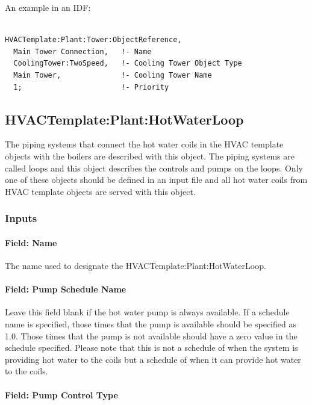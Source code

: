 An example in an IDF:

\begin{lstlisting}

HVACTemplate:Plant:Tower:ObjectReference,
  Main Tower Connection,   !- Name
  CoolingTower:TwoSpeed,   !- Cooling Tower Object Type
  Main Tower,              !- Cooling Tower Name
  1;                       !- Priority
\end{lstlisting}

\subsection{HVACTemplate:Plant:HotWaterLoop}\label{hvactemplateplanthotwaterloop}

The piping systems that connect the hot water coils in the HVAC template objects with the boilers are described with this object. The piping systems are called loops and this object describes the controls and pumps on the loops. Only one of these objects should be defined in an input file and all hot water coils from HVAC template objects are served with this object.

\subsubsection{Inputs}\label{inputs-28-000}

\paragraph{Field: Name}\label{field-name-15-003}

The name used to designate the HVACTemplate:Plant:HotWaterLoop.

\paragraph{Field: Pump Schedule Name}\label{field-pump-schedule-name-1}

Leave this field blank if the hot water pump is always available. If a schedule name is specified, those times that the pump is available should be specified as 1.0. Those times that the pump is not available should have a zero value in the schedule specified. Please note that this is not a schedule of when the system is providing hot water to the coils but a schedule of when it can provide hot water to the coils.

\paragraph{Field: Pump Control Type}\label{field-pump-control-type-1}


